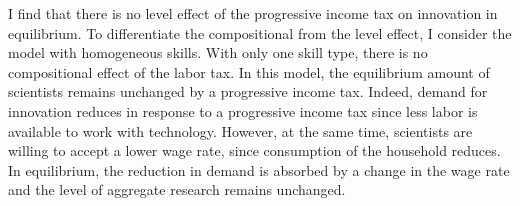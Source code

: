  I find that there is no level effect of the progressive income tax on innovation in equilibrium. To differentiate the compositional from the level effect, I consider the model with homogeneous skills. With only one skill type, there is no compositional effect of the labor tax. In this model, the equilibrium amount of scientists remains unchanged by a progressive income tax. Indeed, demand for innovation reduces in response to a progressive income tax since less labor is available to work with technology. However, at the same time, scientists are willing to accept a lower wage rate, since consumption of the household reduces. In equilibrium, the reduction in demand is absorbed by a change in the wage rate and the level of aggregate research remains unchanged. 

